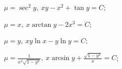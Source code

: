 \begin{enumsols}
		\item \( \mu = \sec^2{y}, ~ xy - x^2 + \tan{y} = C \); \sfill %
		\item \( \mu = x, ~ x \arctan{y} - 2x^3 = C \); \sfill %
		\item \( \mu = y, ~ xy \ln{x} - y \ln{y} = C \); \sfill %
		\item \( \mu = \frac{1}{x^2 \sqrt{1 - y^2}}, ~ x \arcsin{y} + \frac{\sqrt{1 - y^2}}{x} = C \); \sfill %
	
	\end{enumsols}
